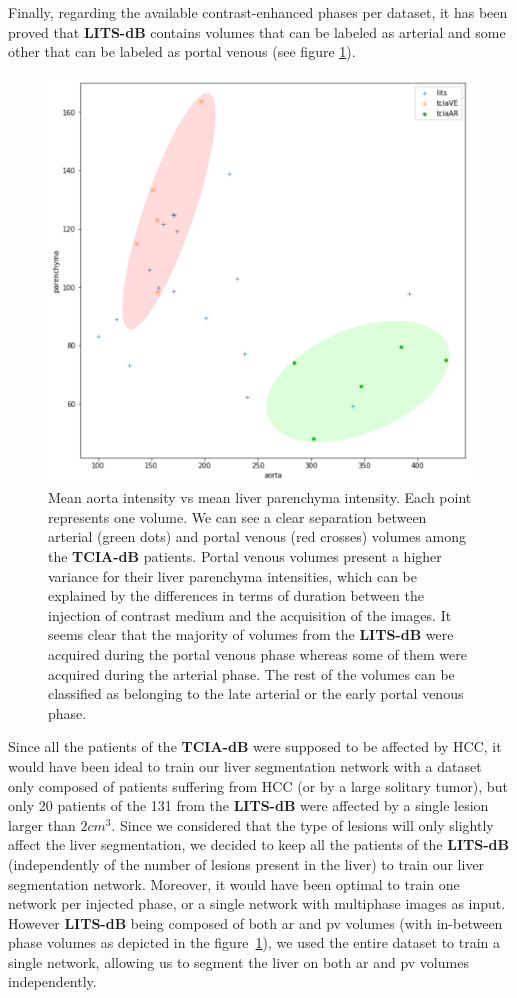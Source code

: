 \documentclass[]{article}
\newcommand{\lmttfont}[1]{{\fontfamily{lmtt}\selectfont #1}}
\begin{document}
Finally, regarding the available contrast-enhanced phases per dataset, it has been proved that \textbf{\lmttfont{LITS-dB}} contains volumes that can be labeled as arterial and some other that can be labeled as portal venous (see figure \ref{fig:LitsTciaPhasePlot}).
\begin{figure}[!ht]
	\centering
	\includegraphics[width=0.6\linewidth]{../Contributions/images/AortaParPlot}
	\caption{Mean aorta intensity vs mean liver parenchyma intensity. Each point represents one volume. We can see a clear separation between arterial (green dots) and portal venous (red crosses) volumes among the \textbf{\lmttfont{TCIA-dB}} patients. Portal venous volumes present a higher variance for their liver parenchyma intensities, which can be explained by the differences in terms of duration between the injection of contrast medium and the acquisition of the images. It seems clear that the majority of volumes from the \textbf{\lmttfont{LITS-dB}} were acquired during the portal venous phase whereas some of them were acquired during the arterial phase. The rest of the volumes can be classified as belonging to the late arterial or the early portal venous phase.
	}
	\label{fig:LitsTciaPhasePlot}
\end{figure}
Since all the patients of the \textbf{\lmttfont{TCIA-dB}} were supposed to be affected by HCC, it would have been ideal to train our liver segmentation network with a dataset only composed of patients suffering from HCC (or by a large solitary tumor), but only 20 patients of the 131 from the \textbf{\lmttfont{LITS-dB}} were affected by a single lesion larger than $ 2cm^3 $.
Since we considered that the type of lesions will only slightly affect the liver segmentation, we decided to keep all the patients of the \textbf{\lmttfont{LITS-dB}} (independently of the number of lesions present in the liver) to train our liver segmentation network.
Moreover, it would have been optimal to train one network per injected phase, or a single network with multiphase images as input.
However \textbf{\lmttfont{LITS-dB}} being composed of both \ac{ar} and \ac{pv} volumes (with in-between phase volumes as depicted in the figure \ref{fig:LitsTciaPhasePlot}), we used the entire dataset to train a single network, allowing us to segment the liver on both \ac{ar} and \ac{pv} volumes independently.
\end{document}
